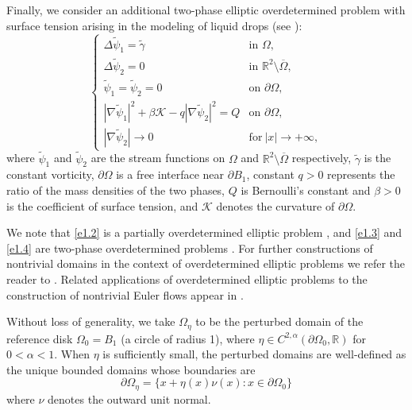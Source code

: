 \documentclass[reqno]{amsart}
\numberwithin{equation}{section}
\numberwithin{equation}{section}
\numberwithin{equation}{section}
\begin{document}
Finally, we consider an additional two-phase elliptic overdetermined problem with surface tension arising in the modeling of liquid drops (see \cite{Meyer}):
\begin{equation}\label{e1.4}
\begin{cases}
\Delta \widetilde{\psi}_1 = \widetilde{\gamma} & \text{in } \Omega, \\
\Delta \widetilde{\psi}_2 = 0 & \text{in } \mathbb{R}^2 \setminus \overline{\Omega}, \\
\widetilde{\psi}_1 = \widetilde{\psi}_2=0 & \text{on } \partial \Omega, \\
| \nabla \widetilde{\psi}_1|^2+\beta\mathcal{K} -q| \nabla \widetilde{\psi}_2|^2 =Q & \text{on } \partial \Omega, \\
|\nabla \widetilde{\psi}_2|\rightarrow 0 & \text{for}~ |x|\rightarrow+\infty,
\end{cases}
\end{equation}
where \(\widetilde{\psi}_1\) and \(\widetilde{\psi}_2\) are the stream functions on \(\Omega\) and \(\mathbb{R}^2 \setminus \overline{\Omega}\) respectively, \(\widetilde{\gamma}\) is the constant vorticity, \(\partial\Omega\) is a free interface near $\partial B_1$, constant $q>0$ represents the ratio of the mass densities of the two phases, $Q$ is Bernoulli's constant and $\beta>0$ is the coefficient of surface tension, and $\mathcal{K}$ denotes the curvature of \(\partial \Omega\).

We note that \eqref{e1.2} is a partially overdetermined elliptic problem \cite{FarinaV,FragalG}, and \eqref{e1.3} and \eqref{e1.4} are two-phase overdetermined problems \cite{Cavallina, CavallinaY}. For further constructions of nontrivial domains in the context of overdetermined elliptic problems we refer the reader to \cite{CFM, DaiSZ, DaiZC, DelPW, FallMW, FallMW1, KamburovS, RosRS, Ruiz1, RuizSW, SchlenkS,Serrin, Sicbaldi}. Related applications of overdetermined elliptic problems to the construction of nontrivial Euler flows appear in \cite{dpmw, DEP, EncisoARS, Gomez, HamelN, Ruiz}.

Without loss of generality, we take \(\Omega_\eta\) to be the perturbed domain of the reference disk \(\Omega_0 = B_1\) (a circle of radius 1), where \(\eta \in C^{2,\alpha}(\partial \Omega_0, \mathbb{R})\) for \(0 < \alpha < 1\). When \(\eta\) is sufficiently small, the perturbed domains are well-defined as the unique bounded domains whose boundaries are
$$
\partial \Omega_\eta = \{ x + \eta(x)\nu(x) : x \in \partial \Omega_0 \}
$$
where \(\nu\) denotes the outward unit normal.
\end{document}
